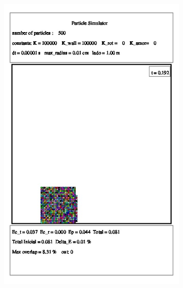 \documentclass[a4paper,11pt]{article}
\begin{document}
\FloatBarrier
\begin{figure}[!hto]
\hspace{-1 cm}
	\begin{subfigure}{0.5\textwidth}
		\includegraphics[scale=0.4]{./images/time_0.jpeg}
		\caption{}
	\end{subfigure}
\hspace{2 cm}
	\begin{subfigure}{0.5\textwidth}

\end{subfigure}
\end{figure}
\end{document}
